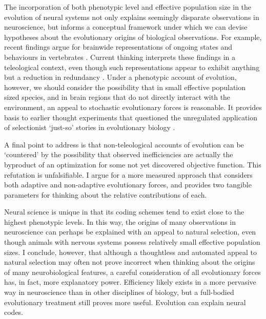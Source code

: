 \documentclass[twocolumn]{article}
\begin{document}
The incorporation of both phenotypic level and effective population size in the evolution of neural systems not only explains seemingly disparate observations in neuroscience, but informs a conceptual framework under which we can devise hypotheses about the evolutionary origins of biological observations. For example, recent findings argue for brainwide representations of ongoing states and behaviours in vertebrates \cite{stringer_harris_2019, allen_deisseroth_2019}. Current thinking interprets these findings in a teleological context, even though such representations appear to exhibit anything but a reduction in redundancy \cite{kaplan_zimmer_2020}. Under a phenotypic account of evolution, however, we should consider the possibility that in small effective population sized species, and in brain regions that do not directly interact with the environment, an appeal to stochastic evolutionary forces is reasonable. It provides basis to earlier thought experiments that questioned the unregulated application of selectionist `just-so' stories in evolutionary biology  \cite{Gould_Lewontin_1979}.

A final point to address is that non-teleological accounts of evolution can be `countered' by the possibility that observed inefficiencies are actually the byproduct of an optimization for some not yet discovered objective function. This refutation is unfalsifiable. I argue for a more measured approach that considers both adaptive and non-adaptive evolutionary forces, and provides two tangible parameters for thinking about the relative contributions of each. 

Neural science is unique in that its coding schemes tend to exist close to the highest phenotypic levels. In this way, the origins of many observations in neuroscience can perhaps be explained with an appeal to natural selection, even though animals with nervous systems possess relatively small effective population sizes. I conclude, however, that although a thoughtless and automated appeal to natural selection may often not prove incorrect when thinking about the origins of many neurobiological features, a careful consideration of all evolutionary forces has, in fact, more explanatory power. Efficiency likely exists in a more pervasive way in neuroscience than in other disciplines of biology, but a full-bodied evolutionary treatment still proves more useful. Evolution can explain neural codes. 

\newpage
 



\end{document}

